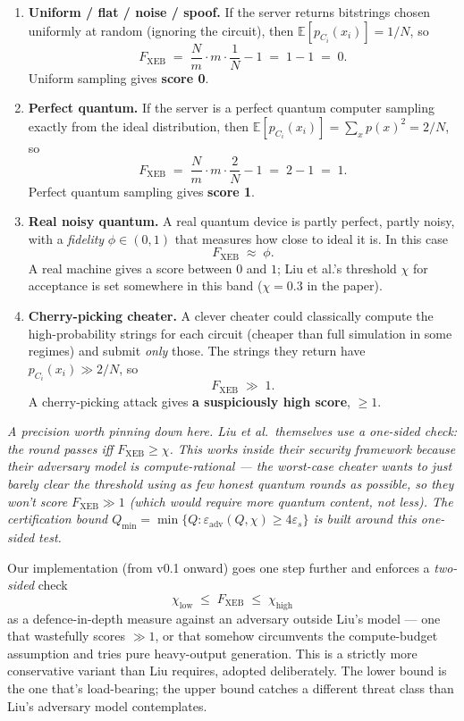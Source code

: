 \documentclass[11pt]{article}
\newenvironment{aside}{\par\medskip\noindent\itshape\small\color{black!70}}{\normalfont\par\medskip}
\newcommand{\Fxeb}{F_{\text{XEB}}}
\begin{document}
\begin{enumerate}[leftmargin=2em, itemsep=4pt]
\item \textbf{Uniform / flat / noise / spoof.} If the server returns bitstrings chosen uniformly at random (ignoring the circuit), then $\mathbb{E}[p_{C_i}(x_i)] = 1/N$, so
\[
\Fxeb \;=\; \frac{N}{m}\cdot m \cdot \frac{1}{N} - 1 \;=\; 1 - 1 \;=\; 0.
\]
Uniform sampling gives \textbf{score 0}.

\item \textbf{Perfect quantum.} If the server is a perfect quantum computer sampling exactly from the ideal distribution, then $\mathbb{E}[p_{C_i}(x_i)] = \sum_x p(x)^2 = 2/N$, so
\[
\Fxeb \;=\; \frac{N}{m}\cdot m \cdot \frac{2}{N} - 1 \;=\; 2 - 1 \;=\; 1.
\]
Perfect quantum sampling gives \textbf{score 1}.

\item \textbf{Real noisy quantum.} A real quantum device is partly perfect, partly noisy, with a \emph{fidelity} $\phi \in (0,1)$ that measures how close to ideal it is. In this case
\[
\Fxeb \;\approx\; \phi.
\]
A real machine gives a score between $0$ and $1$; Liu et al.'s threshold $\chi$ for acceptance is set somewhere in this band ($\chi = 0.3$ in the paper).

\item \textbf{Cherry-picking cheater.} A clever cheater could classically compute the high-probability strings for each circuit (cheaper than full simulation in some regimes) and submit \emph{only} those. The strings they return have $p_{C_i}(x_i) \gg 2/N$, so
\[
\Fxeb \;\gg\; 1.
\]
A cherry-picking attack gives \textbf{a suspiciously high score}, $\geq 1$.
\end{enumerate}

\begin{aside}
A precision worth pinning down here. Liu et al.\ themselves use a \emph{one-sided} check: the round passes iff $\Fxeb \geq \chi$. This works inside their security framework because their adversary model is \emph{compute-rational} --- the worst-case cheater wants to \emph{just barely} clear the threshold using as few honest quantum rounds as possible, so they won't score $\Fxeb \gg 1$ (which would require \emph{more} quantum content, not less). The certification bound $Q_{\min} = \min\{Q : \varepsilon_{\text{adv}}(Q, \chi) \geq 4\varepsilon_s\}$ is built around this one-sided test.

Our implementation (from v0.1 onward) goes one step further and enforces a \emph{two-sided} check
\[
\chi_{\text{low}} \;\leq\; \Fxeb \;\leq\; \chi_{\text{high}}
\]
as a defence-in-depth measure against an adversary outside Liu's model --- one that wastefully scores $\gg 1$, or that somehow circumvents the compute-budget assumption and tries pure heavy-output generation. This is a strictly more conservative variant than Liu requires, adopted deliberately. The lower bound is the one that's load-bearing; the upper bound catches a different threat class than Liu's adversary model contemplates.
\end{aside}
\end{document}
